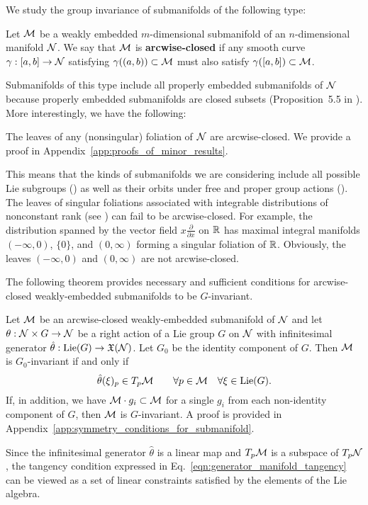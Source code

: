 \documentclass[twoside,11pt]{article}
\begin{document}
We study the group invariance of submanifolds of the following type:
\begin{definition}
    \label{def:closed_slice}
    Let ${\mathcal{M}}$ be a weakly embedded $m$-dimensional submanifold of an $n$-dimensional manifold ${\mathcal{N}}$. 
    We say that ${\mathcal{M}}$ is \textbf{arcwise-closed} if any smooth curve $\gamma:[a,b] \to {\mathcal{N}}$ satisfying $\gamma((a,b)) \subset {\mathcal{M}}$ must also satisfy $\gamma([a,b])\subset {\mathcal{M}}$.
\end{definition}
\noindent
Submanifolds of this type include all properly embedded submanifolds of ${\mathcal{N}}$ because properly embedded submanifolds are closed subsets (Proposition~5.5 in \cite{Lee2013introduction}).
More interestingly, we have the following:
\begin{proposition}
    \label{prop:foliations_have_arcwise_closed_leaves}
    The leaves of any (nonsingular) foliation of ${\mathcal{N}}$ are arcwise-closed.
    We provide a proof in Appendix~\ref{app:proofs_of_minor_results}.
\end{proposition}
This means that the kinds of submanifolds we are considering include all possible Lie subgroups (\citet[Theorem~19.25]{Lee2013introduction}) as well as their orbits under free and proper group actions (\citet[Proposition~21.7]{Lee2013introduction}).
The leaves of singular foliations associated with integrable distributions of nonconstant rank (see \citet[Sections~3.18--25]{Kolar1993natural}) can fail to be arcwise-closed.
For example, the distribution spanned by the vector field $x\frac{\partial}{\partial x}$ on $\mathbb{R}$ has maximal integral manifolds $(-\infty, 0)$, $\{0\}$, and $(0,\infty)$ forming a singular foliation of $\mathbb{R}$.
Obviously, the leaves $(-\infty,0)$ and $(0,\infty)$ are not arcwise-closed.

The following theorem provides necessary and sufficient conditions for arcwise-closed weakly-embedded submanifolds to be $G$-invariant.
\begin{theorem}
    \label{thm:symmetry_conditions_for_submanifold}
    Let ${\mathcal{M}}$ be an arcwise-closed weakly-embedded submanifold of ${\mathcal{N}}$ and let $\theta: {\mathcal{N}}\times G \to {\mathcal{N}}$ be a right action of a Lie group $G$ on ${\mathcal{N}}$ with infinitesimal generator $\hat{\theta}:\operatorname{Lie}(G) \to \mathfrak{X}({\mathcal{N}})$.
    Let $G_0$ be the identity component of $G$.
    Then ${\mathcal{M}}$ is $G_0$-invariant if and only if
    \begin{equation}
        \hat{\theta}(\xi)_p \in T_p{\mathcal{M}} \qquad \forall p\in{\mathcal{M}} \quad \forall \xi \in \operatorname{Lie}(G).
        \label{eqn:generator_manifold_tangency}
    \end{equation}
    If, in addition, we have ${\mathcal{M}} \cdot g_i \subset {\mathcal{M}}$ for a single $g_i$ from each non-identity component of $G$, then ${\mathcal{M}}$ is $G$-invariant.
    A proof is provided in Appendix~\ref{app:symmetry_conditions_for_submanifold}.
\end{theorem}
Since the infinitesimal generator $\hat{\theta}$ is a linear map and $T_p{\mathcal{M}}$ is a subspace of $T_p{\mathcal{N}}$, the tangency condition expressed in Eq.~\ref{eqn:generator_manifold_tangency} can be viewed as a set of linear constraints satisfied by the elements of the Lie algebra.
\end{document}
